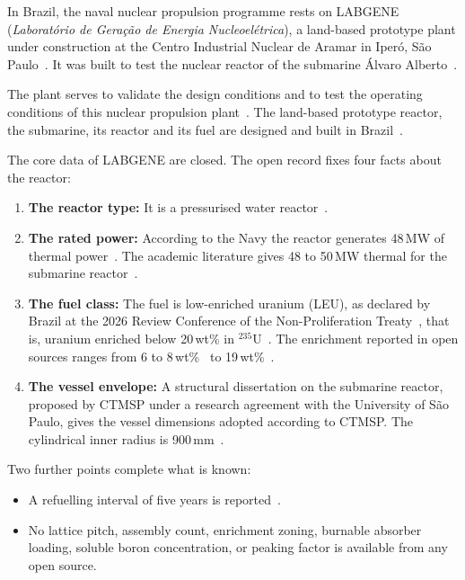 In Brazil, the naval nuclear propulsion programme rests on LABGENE
(\emph{Laboratório de Geração de Energia Nucleoelétrica}), a
land-based prototype plant under construction at the Centro Industrial
Nuclear de Aramar in Iperó, São Paulo~\cite{ctmsp_visita_2018}. It
was built to test the nuclear reactor of the submarine Álvaro
Alberto~\cite{vasconcelos_fapesp_2025}.

The plant serves to validate the design conditions and to test the
operating conditions of this nuclear propulsion
plant~\cite{ctmsp_labgene_2015}. The land-based prototype reactor, the
submarine, its reactor and its fuel are designed and built in
Brazil~\cite{brazil_npt_wp13_2026}.

The core data of LABGENE are closed. The open record fixes four facts
about the reactor:

\begin{enumerate}
  \item \textbf{The reactor type:} It is a pressurised water
        reactor~\cite{ctmsp_labgene_2015}.

  \item \textbf{The rated power:} According to the Navy the reactor
        generates 48\,MW of thermal power~\cite{demartini_nuclep_2022}.
        The academic literature gives 48 to 50\,MW thermal for the
        submarine reactor~\cite{dinizcosta_2017}.

  \item \textbf{The fuel class:} The fuel is low-enriched uranium (LEU),
        as declared by Brazil at the 2026 Review Conference of the
        Non-Proliferation Treaty~\cite{brazil_npt_wp13_2026}, that is,
        uranium enriched below 20\,wt\% in
        $^{235}$U~\cite{nrc_10cfr110_2}. The enrichment reported in open
        sources ranges from 6 to 8\,wt\%~\cite{dinizcosta_2017} to
        19\,wt\%~\cite{vasconcelos_fapesp_2025}.

  \item \textbf{The vessel envelope:} A structural dissertation on the
        submarine reactor, proposed by CTMSP under a research agreement
        with the University of São Paulo, gives the vessel dimensions
        adopted according to CTMSP. The cylindrical inner radius is
        900\,mm~\cite{maruyama_2013}.
\end{enumerate}

Two further points complete what is known:

\begin{itemize}
  \item A refuelling interval of five years is reported~\cite{dinizcosta_2017}.

  \item No lattice pitch, assembly count, enrichment zoning, burnable
        absorber loading, soluble boron concentration, or peaking factor
        is available from any open source.
\end{itemize}

